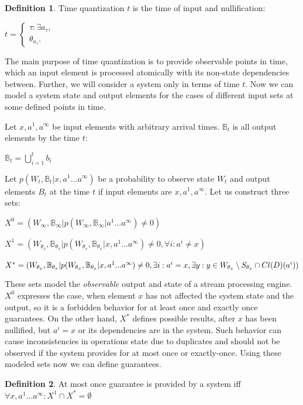 \documentclass[sigconf]{acmart}
\theoremstyle{definition}
\newtheorem{definition}{Definition}
\begin{document}
\begin{definition}{Time quantization}
$t$ is the time of input and nullification:

$t=\begin{cases}
\tau:\exists{a_{\tau}}, \\
\theta_{a_\tau}.
\end{cases}$
\end{definition}

The main purpose of time quantization is to provide observable points in time, which an input element is processed atomically with its non-state dependencies between. Further, we will consider a system only in terms of time $t$. Now we can model a system state and output elements for the cases of different input sets at some defined points in time. 

Let $x,a^{1},a^\infty$ be input elements with arbitrary arrival times. $\mathbb{B}_t$ is all output elements by the time $t$:

$\mathbb{B}_t=\bigcup\limits_{i=1}^{t}{b_i}$

Let $p(W_t,\mathbb{B}_t|x,a^{1}...a^\infty)$ be a probability to observe state $W_t$ and output elements $B_t$ at the time $t$ if input elements are $x,a^{1},a^\infty$. Let us construct three sets:

$X^0=(W_\infty,\mathbb{B}_\infty|p(W_\infty,\mathbb{B}_\infty|a^{1}...a^\infty)\neq{0})$

$X^1=(W_{\theta_{x}},\mathbb{B}_{\theta_{x}}|p(W_{\theta_{x}},\mathbb{B}_{\theta_{x}}|x,a^{1}...a^\infty)\neq{0},\forall{i}:{a^i}\neq{x})$

$X^{*}=(W_{\theta_{x}},\mathbb{B}_{\theta_{x}}|p(W_{\theta_{x}},\mathbb{B}_{\theta_{x}}|x,a^{1}...a^\infty)\neq{0},\\
\exists{i}:{a^i={x}},\exists{y:y\in{W_{\theta_{x}}\setminus{S_{\theta_x}}}\cap{Cl(D)(a^i)}})$

These sets model the {\em observable} output and state of a stream processing engine. $X^0$ expresses the case, when element $x$ has not affected the system state and the output, so it is a forbidden behavior for at least once and exactly once guarantees. On the other hand, $X^{*}$ defines possible results, after $x$ has been nullified, but $a^i=x$ or its dependencies are in the system. Such behavior can cause inconsistencies in operations state due to duplicates and should not be observed if the system provides for at most once or exactly-once. Using these modeled sets now we can define guarantees.

\begin{definition}{At most once}
guarantee is provided by a system iff $\forall{x,a^{1}...a^\infty}:X^{1}\cap{X^{*}}=\emptyset$
\end{definition}
\end{document}
